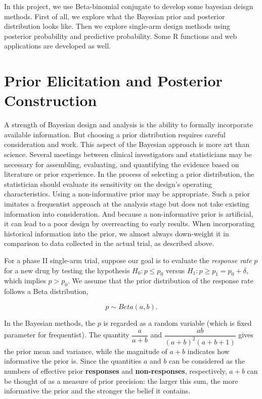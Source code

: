 \documentclass[]{article}
\begin{document}
In this project, we use Beta-binomial conjugate to develop some bayesian
deisgn methods. First of all, we explore what the Bayesian prior and
posterior distribution looks like. Then we explore single-arm design
methods using posterior probability and predictive probability. Some R
functions and web applications are developed as well.

\section{Prior Elicitation and Posterior
Construction}\label{prior-elicitation-and-posterior-construction}

A strength of Bayesian design and analysis is the ability to formally
incorporate available information. But choosing a prior distribution
requires careful consideration and work. This aspect of the Bayesian
approach is more art than science. Several meetings between clinical
investigators and statisticians may be necessary for assembling,
evaluating, and quantifying the evidence based on literature or prior
experience. In the process of selecting a prior distribution, the
statistician should evaluate its sensitivity on the design's operating
characteristics. Using a non-informative prior may be appropriate. Such
a prior imitates a frequentist approach at the analysis stage but does
not take existing information into consideration. And because a
non-informative prior is artificial, it can lead to a poor design by
overreacting to early results. When incorporating historical information
into the prior, we almost always down-weight it in comparison to data
collected in the actual trial, as described above.

For a phase II single-arm trial, suppose our goal is to evaluate the
\emph{response rate} \(p\) for a new drug by testing the hypothesis
\(H_0: p \le p_0\) versus \(H_1: p \ge p_1 = p_0 + \delta\), which
implies \(p>p_0\). We assume that the prior distribution of the response
rate follows a Beta distribution,

\[p \sim Beta(a, b).\]

In the Bayesian methods, the \(p\) is regarded as a random variable
(which is fixed parameter for frequentist). The quantity
\(\dfrac{a}{a + b}\) and \(\dfrac{ab}{(a+b)^2(a+b+1)}\) gives the prior
mean and variance, while the magnitude of \(a + b\) indicates how
informative the prior is. Since the quantities \textbf{\(a\)} and
\textbf{\(b\)} can be considered as the numbers of effective prior
\textbf{responses} and \textbf{non-responses}, respectively, \(a+b\) can
be thought of as a measure of prior precision: the larger this sum, the
more informative the prior and the stronger the belief it contains.
\end{document}
